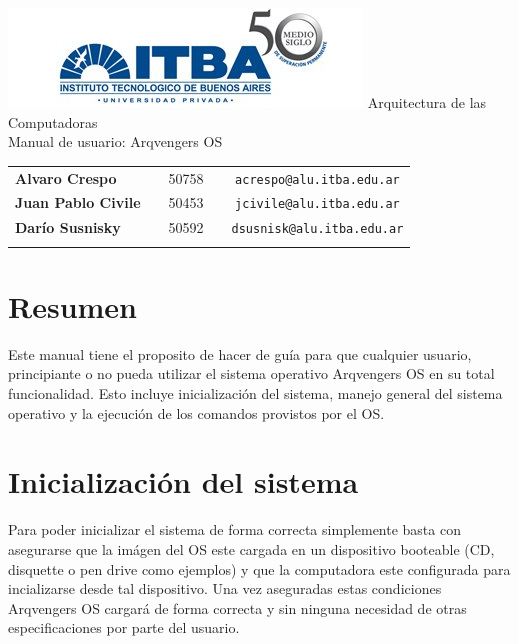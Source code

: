 \documentclass[a4paper,10pt]{article}
\begin{document}
\begin{titlepage}
        \thispagestyle{empty}
        \begin{center}
                \includegraphics{./images/itba.jpg}
                \vfill
                \Huge{Arquitectura de las Computadoras}\\
                \vspace{1cm}
                \huge{Manual de usuario: Arqvengers OS}\\
        \end{center}
        \vspace{2cm}
        \large{
                \begin{tabular}{lcrc}
                        \textbf{Alvaro Crespo} & & 50758 & \ \ \texttt{acrespo@alu.itba.edu.ar}\\
                        \textbf{Juan Pablo Civile} & & 50453 & \ \ \texttt{jcivile@alu.itba.edu.ar}\\
                        \textbf{Darío Susnisky} & & 50592 & \ \ \texttt{dsusnisk@alu.itba.edu.ar}\\
                        \\ 
                \end{tabular}
        }
        \vfill
\end{titlepage}

\setcounter{page}{1}

\tableofcontents
\newpage

\section{Resumen}
    Este manual tiene el proposito de hacer de guía para que cualquier usuario, principiante o no pueda utilizar el sistema operativo Arqvengers OS en su total funcionalidad. Esto incluye inicialización del sistema, manejo general del sistema operativo y la ejecución de los comandos provistos por el OS.

\section{Inicialización del sistema}
    Para poder inicializar el sistema de forma correcta simplemente basta con asegurarse que la imágen del OS este cargada en un dispositivo booteable (CD, disquette o pen drive como ejemplos) y que la computadora este configurada para incializarse desde tal dispositivo. Una vez aseguradas estas condiciones Arqvengers OS cargará de forma correcta y sin ninguna necesidad de otras especificaciones por parte del usuario.
\end{document}

